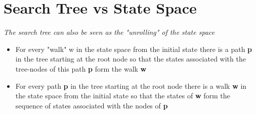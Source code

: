 \documentclass{article}[18pt]
\begin{document}
\section{Search Tree vs State Space}
\textit{The search tree can also be seen as the "unrolling" of the state space}
\begin{itemize}
	\item For every "walk" w in the state space from the initial state there is a path \textbf{p} in the tree starting at the root node so that the states associated with the tree-nodes of this path \textbf{p} form the walk \textbf{w}
	\item For every path \textbf{p} in the tree starting at the root node there is a walk \textbf{w} in the state space from the initial state so that the states of \textbf{w} form the sequence of states associated with the nodes of \textbf{p}
\end{itemize}
\end{document}
